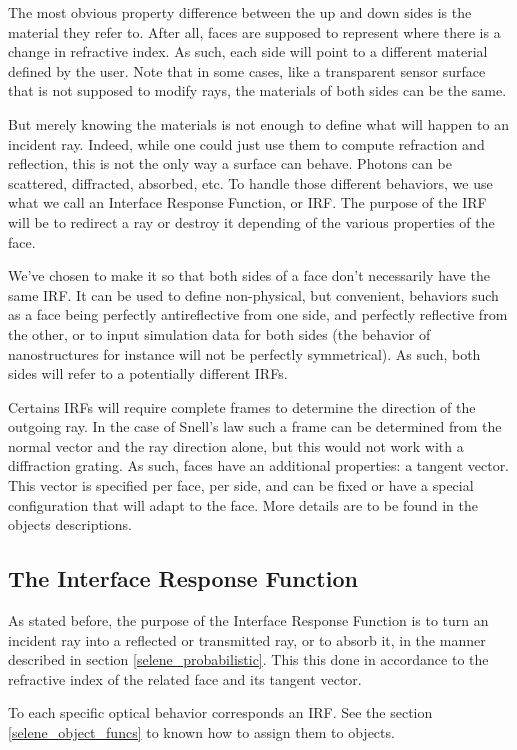 The most obvious property difference between the up and down sides is the material they refer to. After all, faces are supposed to represent where there is a change in refractive index. As such, each side will point to a different material defined by the user. Note that in some cases, like a transparent sensor surface that is not supposed to modify rays, the materials of both sides can be the same.

But merely knowing the materials is not enough to define what will happen to an incident ray. Indeed, while one could just use them to compute refraction and reflection, this is not the only way a surface can behave. Photons can be scattered, diffracted, absorbed, etc. To handle those different behaviors, we use what we call an Interface Response Function, or IRF. The purpose of the IRF will be to redirect a ray or destroy it depending of the various properties of the face.

We've chosen to make it so that both sides of a face don't necessarily have the same IRF. It can be used to define non-physical, but convenient, behaviors such as a face being perfectly antireflective from one side, and perfectly reflective from the other, or to input simulation data for both sides (the behavior of nanostructures for  instance will not be perfectly symmetrical). As such, both sides will refer to a potentially different IRFs.

Certains IRFs will require complete frames to determine the direction of the outgoing ray. In the case of Snell's law such a frame can be determined from the normal vector and the ray direction alone, but this would not work with a diffraction grating. As such, faces have an additional properties: a tangent vector. This vector is specified per face, per side, and can be fixed or have a special configuration that will adapt to the face. More details are to be found in the objects descriptions.

\subsection{The Interface Response Function}

As stated before, the purpose of the Interface Response Function is to turn an incident ray into a reflected or transmitted ray, or to absorb it, in the manner described in section \ref{selene_probabilistic}. This this done in accordance to the refractive index of the related face and its tangent vector.

To each specific optical behavior corresponds an IRF. See the section \ref{selene_object_funcs} to known how to assign them to objects.

